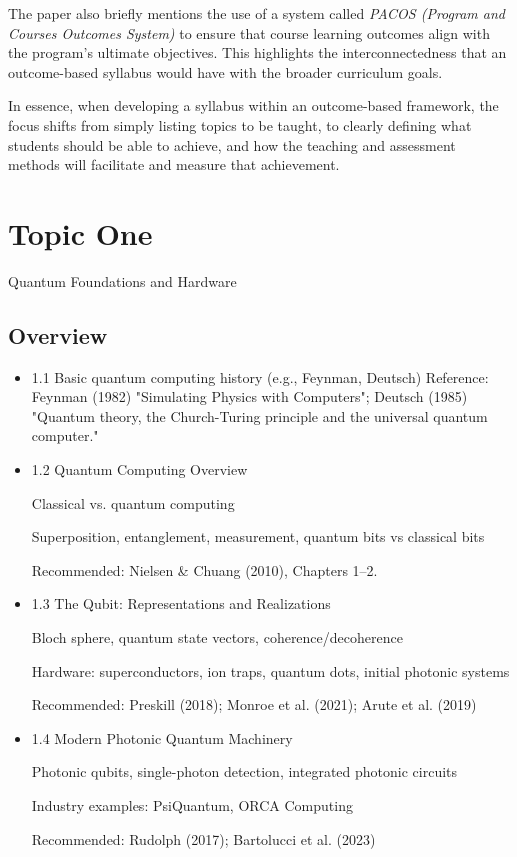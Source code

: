 \documentclass[11pt,a4paper]{article}
\begin{document}
	The paper also briefly mentions the use of a system called \emph{PACOS (Program and Courses Outcomes System)} to ensure that course learning outcomes align with the program's ultimate objectives. This highlights the interconnectedness that an outcome-based syllabus would have with the broader curriculum goals.
	
	In essence, when developing a syllabus within an outcome-based framework, the focus shifts from simply listing topics to be taught, to clearly defining what students should be able to achieve, and how the teaching and assessment methods will facilitate and measure that achievement.
	
\section{Topic One}

Quantum Foundations and Hardware

\subsection{Overview}

	\begin{itemize} 

	\item 1.1 Basic quantum computing history (e.g., Feynman, Deutsch)
Reference: Feynman (1982) "Simulating Physics with Computers"; Deutsch (1985) "Quantum theory, the Church-Turing principle and the universal quantum computer."

	\item 1.2 Quantum Computing Overview

	Classical vs. quantum computing
	
	Superposition, entanglement, measurement, quantum bits vs classical bits
	
	Recommended: Nielsen \& Chuang (2010), Chapters 1–2.

	\item 1.3 The Qubit: Representations and Realizations

	Bloch sphere, quantum state vectors, coherence/decoherence
	
	Hardware: superconductors, ion traps, quantum dots, initial photonic systems
	
	Recommended: Preskill (2018); Monroe et al. (2021); Arute et al. (2019)
	
	\item 1.4 Modern Photonic Quantum Machinery

	Photonic qubits, single-photon detection, integrated photonic circuits
	
	Industry examples: PsiQuantum, ORCA Computing
	
	Recommended: Rudolph (2017); Bartolucci et al. (2023)

\end{itemize}
\end{document}
